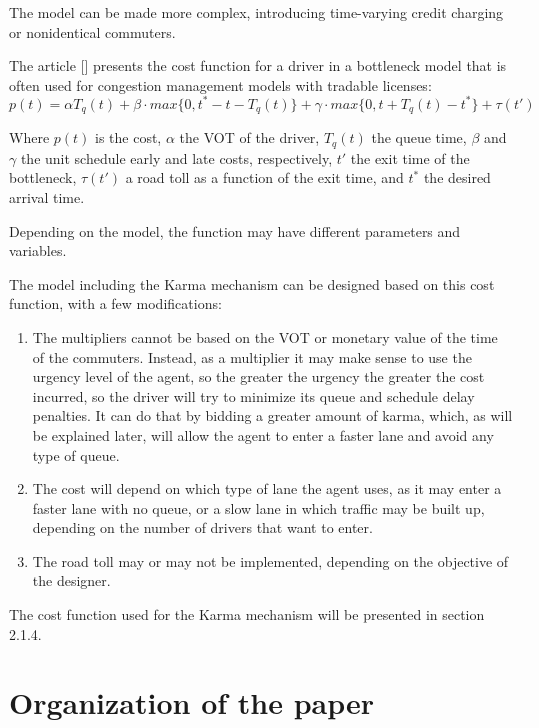 \documentclass[a4paper,11pt,twoside]{book}
\let\oldcite\cite
\renewcommand*\cite[1]{{[\oldcite{#1}]}}
\begin{document}
The model can be made more complex, introducing time-varying credit charging or nonidentical commuters.

The article \cite{Verhoef} presents the cost function for a driver in a bottleneck model that is often used for congestion management models with tradable licenses:
\begin{equation}
    p(t) = \alpha T_q(t) + \beta \cdot max\{0, t^*-t-T_q(t)\} + \gamma \cdot max\{0, t+T_q(t)-t^*\} + \tau(t')
\end{equation}

Where $p(t)$ is the cost, $\alpha$ the VOT of the driver, $T_q(t)$ the queue time, $\beta$ and $\gamma$ the unit schedule early and late costs, respectively, $t'$ the exit time of the bottleneck, $\tau(t')$ a road toll as a function of the exit time, and $t^*$ the desired arrival time. 

Depending on the model, the function may have different parameters and variables.

The model including the Karma mechanism can be designed based on this cost function, with a few modifications:
\begin{enumerate}
    \item The multipliers cannot be based on the VOT or monetary value of the time of the commuters. Instead, as a multiplier it may make sense to use the urgency level of the agent, so the greater the urgency the greater the cost incurred, so the driver will try to minimize its queue and schedule delay penalties. It can do that by bidding a greater amount of karma, which, as will be explained later, will allow the agent to enter a faster lane and avoid any type of queue.
    
    \item The cost will depend on which type of lane the agent uses, as it may enter a faster lane with no queue, or a slow lane in which traffic may be built up, depending on the number of drivers that want to enter.
    
    \item The road toll may or may not be implemented, depending on the objective of the designer.
\end{enumerate}

The cost function used for the Karma mechanism will be presented in section 2.1.4.

\section{Organization of the paper}
\end{document}
